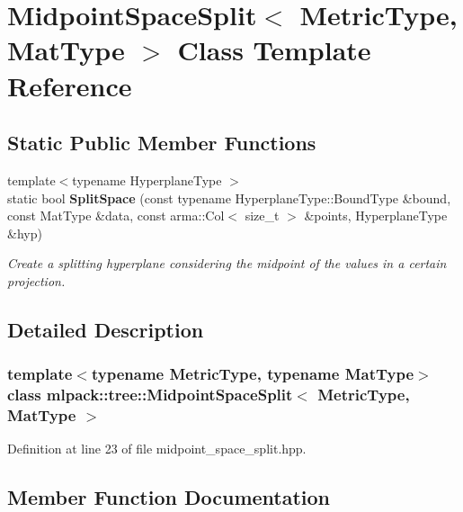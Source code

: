 \section{Midpoint\+Space\+Split$<$ Metric\+Type, Mat\+Type $>$ Class Template Reference}
\label{classmlpack_1_1tree_1_1MidpointSpaceSplit}
\subsection*{Static Public Member Functions}
\begin{DoxyCompactItemize}
\item 
{\footnotesize template$<$typename Hyperplane\+Type $>$ }\\static bool \textbf{ Split\+Space} (const typename Hyperplane\+Type\+::\+Bound\+Type \&bound, const Mat\+Type \&data, const arma\+::\+Col$<$ size\+\_\+t $>$ \&points, Hyperplane\+Type \&hyp)
\begin{DoxyCompactList}\small\item\em Create a splitting hyperplane considering the midpoint of the values in a certain projection. \end{DoxyCompactList}\end{DoxyCompactItemize}


\subsection{Detailed Description}
\subsubsection*{template$<$typename Metric\+Type, typename Mat\+Type$>$\newline
class mlpack\+::tree\+::\+Midpoint\+Space\+Split$<$ Metric\+Type, Mat\+Type $>$}



Definition at line 23 of file midpoint\+\_\+space\+\_\+split.\+hpp.



\subsection{Member Function Documentation}
\mbox{\label{classmlpack_1_1tree_1_1MidpointSpaceSplit_a055fe300d8af558a4d1d1097373740ed}} 
